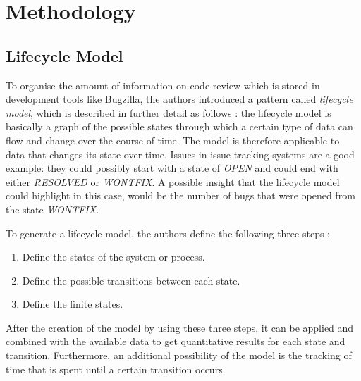 \documentclass[conference]{IEEEtran}
\begin{document}
\section{Methodology}

\subsection{Lifecycle Model}

To organise the amount of information on code review which is stored in development tools like Bugzilla, the authors introduced a pattern called \textit{lifecycle model}, which is described in further detail as follows \cite{baysal2015synthesizing}: the lifecycle model is basically a graph of the possible states through which a certain type of data can flow and change over the course of time. The model is therefore applicable to data that changes its state over time. Issues in issue tracking systems are a good example: they could possibly start with a state of \textit{OPEN} and could end with either \textit{RESOLVED} or \textit{WONTFIX}. A possible insight that the lifecycle model could highlight in this case, would be the number of bugs that were opened from the state \textit{WONTFIX}.

\pagebreak

To generate a lifecycle model, the authors define the following three steps \cite{baysal2015synthesizing}:

\begin{enumerate}
    \item Define the states of the system or process.
    \item Define the possible transitions between each state.
    \item Define the finite states.
\end{enumerate}

After the creation of the model by using these three steps, it can be applied and combined with the available data to get quantitative results for each state and transition. Furthermore, an additional possibility of the model is the tracking of time that is spent until a certain transition occurs.
\end{document}

